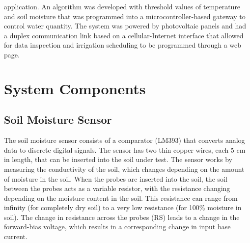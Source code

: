 \documentclass[conference]{IEEEtran}
\begin{document}
application. An algorithm was developed with threshold values of temperature and soil moisture that was programmed into a microcontroller-based gateway to control water quantity. The system was powered by photovoltaic panels and had a duplex communication link based on a cellular-Internet interface that allowed for data inspection and irrigation scheduling to be programmed through a web page\cite{c6}.
	
	\maketitle
	\section{System Components}
	\subsection{Soil Moisture Sensor}
	The soil moisture sensor consists of a comparator (LM393) that converts analog data to discrete digital signals. The sensor has two thin copper wires, each 5 cm in length, that can be inserted into the soil under test. The sensor works by measuring the conductivity of the soil, which changes depending on the amount of moisture in the soil. When the probes are inserted into the soil, the soil between the probes acts as a variable resistor, with the resistance changing depending on the moisture content in the soil. This resistance can range from infinity (for completely dry soil) to a very low resistance (for 100\% moisture in soil). The change in resistance across the probes (RS) leads to a change in the forward-bias voltage, which results in a corresponding change in input base current. 
	
\end{document}
